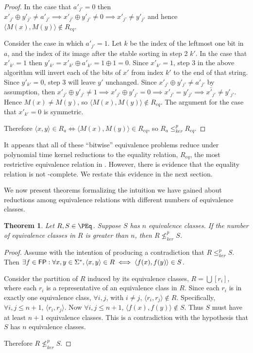 \documentclass{article}
\newtheorem{theorem}{Theorem}[section]
\theoremstyle{definition} \newtheorem{definition}[definition]{Definition}
\newcommand{\sigmastar}{\Sigma^{*}} %
\newcommand{\kr}{\leq^{p}_{ker}} %
\newcommand{\nkr}{\nleq^{p}_{ker}} %
\newcommand{\pair}[2]{\langle#1,#2\rangle} %
\begin{document}
\begin{proof}
  In the case that $a'_{j'}=0$ then $x'_{j'}\oplus y'_{j'}\neq a'_{j'}\implies
  x'_{j'}\oplus y'_{j'}\neq 0\implies x'_{j'}\neq y'_{j'}$ and hence
  $\pair{M(x)}{M(y)}\notin R_{eq}$.

  Consider the case in which $a'_{j'}=1$. Let $k$ be the index of the leftmost
  one bit in $a$, and the index of its image after the stable sorting in step 2
  $k'$. In the case that $x'_{k'}=1$ then $y'_{k'}=x'_{k'}\oplus
  a'_{k'}=1\oplus1=0$. Since $x'_{k'}=1$, step 3 in the above algorithm will
  invert each of the bits of $x'$ from index $k'$ to the end of that
  string. Since $y'_{k'}=0$, step 3 will leave $y'$ unchanged. Since
  $x'_{j'}\oplus y'_{j'}\neq a'_{j'}$ by assumption, then $x'_{j'}\oplus
  y'_{j'}\neq 1\implies x'_{j'}\oplus y'_{j'}=0\implies x'_{j'}=y'_{j'}\implies
  \bar{x'_{j'}}\neq y'_{j'}$. Hence $M(x)\neq M(y)$, so
  $\pair{M(x)}{M(y)}\notin R_{eq}$. The argument for the case that $x'_{k'}=0$
  is symmetric.

  Therefore $\pair{x}{y}\in R_a\iff\pair{M(x)}{M(y)}\in R_{eq}$, so $R_a\kr
  R_{eq}$.
\end{proof}

It appears that all of these ``bitwise'' equivalence problems reduce under
polynomial time kernel reductions to the equality relation, $R_{eq}$, the most
restrictive equivalence relation in \PEq. However, there is evidence\cite{fg09}
that the equality relation is not \PEq-complete. We restate this evidence in
the next section.

We now present theorems formalizing the intuition we have gained about
reductions among equivalence relations with different numbers of equivalence
classes.
\begin{theorem}
  Let $R,S\in\PEq$. Suppose $S$ has $n$ equivalence classes. If the number of
  equivalence classes in $R$ is greater than $n$, then $R\nkr S$.
\end{theorem}
\begin{proof}
  Assume with the intention of producing a contradiction that $R\kr S$. Then
  $\exists f\in\FP:\forall x,y\in\sigmastar, \pair{x}{y}\in R\iff
  \pair{f(x)}{f(y)}\in S$.

  Consider the partition of $R$ induced by its equivalence classes,
  $R=\bigcup{[r_i]}$, where each $r_i$ is a representative of an equivalence
  class in $R$. Since each $r_i$ is in exactly one equivalence class, $\forall
  i,j$, with $i\neq j$, $\pair{r_i}{r_j}\notin R$. Specifically, $\forall i,j
  \leq n+1$, $\pair{r_i}{r_j}$. Now $\forall i,j \leq n+1$,
  $\pair{f(x)}{f(y)}\notin S$. Thus $S$ must have at least $n+1$ equivalence
  classes. This is a contradiction with the hypothesis that $S$ has $n$
  equivalence classes.

  Therefore $R\nkr S$.
\end{proof}
\end{document}
